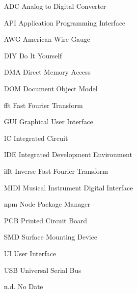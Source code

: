 \renewcommand{\listadesiglasname}{List of acronyms}
\begin{acronyms}
  \item[ADC] Analog to Digital Converter
  \item[API] Application Programming Interface
  \item[AWG] American Wire Gauge
  \item[DIY] Do It Yourself
  \item[DMA] Direct Memory Access
  \item[DOM] Document Object Model
  \item[fft] Fast Fourier Transform
  \item[GUI] Graphical User Interface
  \item[IC] Integrated Circuit
  \item[IDE] Integrated Development Environment
  \item[ifft] Inverse Fast Fourier Transform
  \item[MIDI] Musical Instrument Digital Interface
  \item[npm] Node Package Manager
  \item[PCB] Printed Circuit Board
  \item[SMD] Surface Mounting Device
  \item[UI] User Interface
  \item[USB] Universal Serial Bus
  \item[n.d.] No Date
\end{acronyms}
